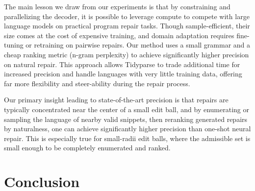 \documentclass[runningheads]{llncs}
\makeatletter
\def\squigglyred{\bgroup \markoverwith{\textcolor{red}{\lower3\p@\hbox{\sixly \char58}}}\ULon}
\newcommand{\err}[1]{\smash{\squigglyred{#1}{}}}
\makeatother
\begin{document}
%
%

The main lesson we draw from our experiments is that by constraining and parallelizing the decoder, it is possible to leverage compute to compete with large language models on practical program repair tasks. Though sample-efficient, their size comes at the cost of expensive training, and domain adaptation requires fine-tuning or retraining on pairwise repairs. Our method uses a small grammar and a cheap ranking metric (n-gram perplexity) to achieve significantly higher precision on natural repair. This approach allows Tidyparse to trade additional time for increased precision and handle languages with very little training data, offering far more flexibility and steer-ability during the repair process.

Our primary insight leading to state-of-the-art precision is that repairs are typically concentrated near the center of a small edit ball, and by enumerating or sampling the language of nearby valid snippets, then reranking generated repairs by naturalness, one can achieve significantly higher precision than one-shot neural repair. This is especially true for small-radii edit balls, where the admissible set is small enough to be completely enumerated and ranked.

\section{Conclusion}
\end{document}
